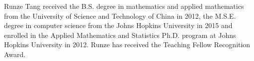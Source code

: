 
\begin{vita}


Runze Tang received the B.S. degree in mathematics and applied mathematics from the University of Science and Technology of China in 2012, the M.S.E. degree in computer science from the Johns Hopkins University in 2015 and enrolled in the Applied Mathematics and Statistics Ph.D. program at Johns Hopkins University in 2012. Runze has received the Teaching Fellow Recognition Award.


\end{vita}